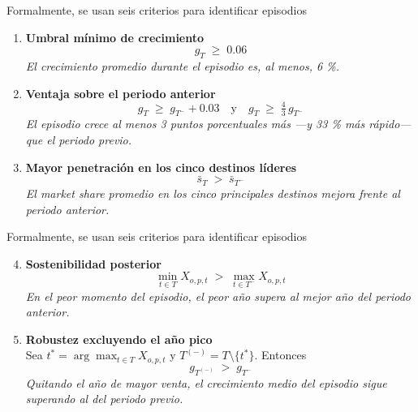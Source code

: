 \documentclass[aspectratio=169,xcolor=dvipsnames]{beamer}
\begin{document}
\begin{frame}{Formalmente, se usan seis criterios para identificar episodios}
  \begin{enumerate}
    \item \textbf{Umbral mínimo de crecimiento}\smallskip\\
          \[
            g_{T}\;\ge\;0.06
          \]
          \emph{El crecimiento promedio durante el episodio es, al menos, 6 \%.}

    \item \textbf{Ventaja sobre el periodo anterior}\smallskip\\
          \[
            g_{T}\;\ge\;g_{T^{-}}+0.03
            \quad\text{y}\quad
            g_{T}\;\ge\;\tfrac{4}{3}\,g_{T^{-}}
          \]
          \emph{El episodio crece al menos 3 puntos porcentuales más —y 33 \% más rápido— que el periodo previo.}

    \item \textbf{Mayor penetración en los cinco destinos líderes}\smallskip\\
          \[
            \bar{s}_{T}\;>\;\bar{s}_{T^{-}}
          \]
          \emph{El market share promedio en los cinco principales destinos mejora frente al periodo anterior.}
  \end{enumerate}
\end{frame}

\begin{frame}{Formalmente, se usan seis criterios para identificar episodios}
  \begin{enumerate}\setcounter{enumi}{3}
    \item \textbf{Sostenibilidad posterior}\smallskip\\
          \[
            \min_{t\in T} X_{o,p,t}\;>\;\max_{t\in T^{-}} X_{o,p,t}
          \]
          \emph{En el peor momento del episodio, el peor año supera al mejor año del periodo anterior.}

    \item \textbf{Robustez excluyendo el año pico}\smallskip\\
          Sea \(t^{\ast}=\arg\max_{t\in T}X_{o,p,t}\) y \(T^{(-)}=T\setminus\{t^{\ast}\}\). Entonces
          \[
            g_{T^{(-)}}\;>\;g_{T^{-}}
          \]
          \emph{Quitando el año de mayor venta, el crecimiento medio del episodio sigue superando al del periodo previo.}
  \end{enumerate}
\end{frame}
\end{document}
